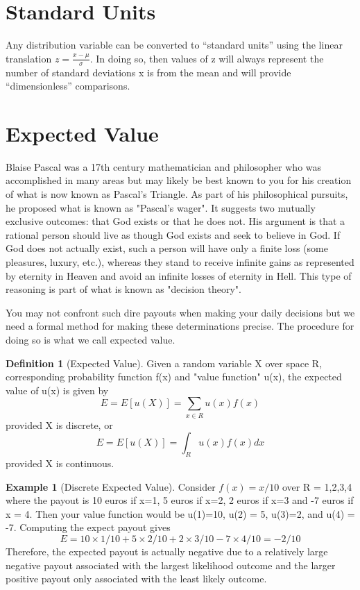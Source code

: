 \documentclass[10pt,]{book}
\theoremstyle{plain}
\theoremstyle{definition}
\newtheorem{definition}[theorem]{Definition}
\theoremstyle{definition}
\newtheorem{example}[theorem]{Example}
\theoremstyle{definition}
\numberwithin{equation}{section}
\begin{document}
\section[Standard Units]{Standard Units}\label{section-25}
Any distribution variable can be converted to “standard units” using the linear translation 
			\(\displaystyle z = \frac{x-\mu}{\sigma}\). In doing so, then values of z will always represent the number of
			standard deviations x is from the mean and will provide “dimensionless” comparisons.%
\typeout{************************************************}
\typeout{************************************************}
\section[Expected Value]{Expected Value}\label{section-26}
Blaise Pascal was a 	17th century mathematician and philosopher who was accomplished in many areas but may likely be best known to you for his creation of what is now known as Pascal's Triangle. As part of his philosophical pursuits, he proposed what is known as "Pascal's wager". It suggests two  mutually exclusive outcomes: that God exists or that he does not. His argument is that a rational person should live as though God exists and seek to believe in God. If God does not actually exist, such a person will have only a finite loss (some pleasures, luxury, etc.), whereas they stand to receive infinite gains as represented by eternity in Heaven and avoid an infinite losses of eternity in Hell. This type of reasoning is part of what is known as "decision theory".
\par
You may not confront such dire payouts when making your daily decisions but we need a formal method for making these determinations precise. The procedure for doing so is what we call expected value.
\begin{definition}[Expected Value]\label{definition-30}
Given a random variable X over space R, corresponding probability function f(x) and "value function" u(x), the expected value of u(x) is given by
	\begin{equation*}E = E[u(X)] = \sum_{x \in R} u(x) f(x)\end{equation*}
	provided X is discrete, or
	\begin{equation*}E = E[u(X)] = \int_R u(x)f(x) dx\end{equation*}
	provided X is continuous.
\end{definition}
\begin{example}[Discrete Expected Value]\label{example-19}
Consider \(f(x) = x/10\) over R = {1,2,3,4} where the payout is 10 euros if x=1, 5 euros if x=2, 2 euros if x=3 and -7 euros if x = 4.  Then your value function would be u(1)=10, u(2) = 5, u(3)=2, and u(4) = -7. Computing the expect payout gives
	\begin{equation*}E = 10 \times 1/10 + 5 \times 2/10 + 2 \times 3/10 - 7 \times 4/10 = -2/10\end{equation*}
	Therefore, the expected payout is actually negative due to a relatively large negative payout associated with the largest likelihood outcome and the larger positive payout only associated with the least likely outcome.
\end{example}
\end{document}
